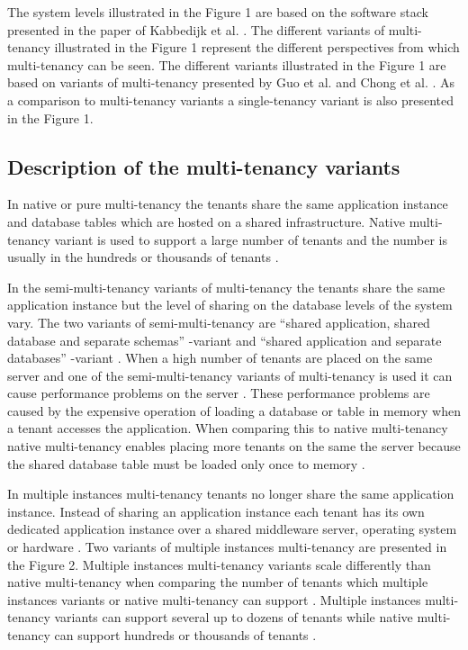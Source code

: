 \documentclass[conference]{sasmoota2017}
\begin{document}
The system levels illustrated in the Figure 1 are based on the software stack presented in the paper of Kabbedijk et al. \cite{Kabbedijk2015:Defining}. The different variants of multi-tenancy illustrated in the Figure 1 represent the different perspectives from which multi-tenancy can be seen. The different variants illustrated in the Figure 1 are based on variants of multi-tenancy presented by Guo et al. \cite{Guo:2007:FrameworkForNative} and Chong et al. \cite{Chong:2006:MultiTenantDataArchitecture}. As a comparison to multi-tenancy variants a single-tenancy variant is also presented in the Figure 1. 


\subsection{Description of the multi-tenancy variants}

In native or pure multi-tenancy \cite{Kabbedijk2015:Defining, Guo:2007:FrameworkForNative} the tenants share the same application instance and database tables which are hosted on a shared infrastructure. Native multi-tenancy variant is used to support a large number of tenants and the number is usually in the hundreds or thousands of tenants \cite{Guo:2007:FrameworkForNative}. 

In the semi-multi-tenancy variants of multi-tenancy \cite{Chong:2006:MultiTenantDataArchitecture, Bezemer:2010:MaintenanceDream} the tenants share the same application instance but the level of sharing on the database levels of the system vary. The two variants of semi-multi-tenancy are “shared application, shared database and separate schemas” -variant and “shared application and separate databases” -variant \cite{Chong:2006:MultiTenantDataArchitecture}. When a high number of tenants are placed on the same server and one of the semi-multi-tenancy variants of multi-tenancy is used it can cause performance problems on the server \cite{Bezemer:2010:MaintenanceDream}. These performance problems are caused by the expensive operation of loading a database or table in memory when a tenant accesses the application. When comparing this to native multi-tenancy native multi-tenancy enables placing more tenants on the same the server because the shared database table must be loaded only once to memory \cite{Bezemer:2010:MaintenanceDream}.

In multiple instances multi-tenancy \cite{Guo:2007:FrameworkForNative} tenants no longer share the same application instance. Instead of sharing an application instance each tenant has its own dedicated application instance over a shared middleware server, operating system or hardware \cite{Guo:2007:FrameworkForNative}. Two variants of multiple instances multi-tenancy are presented in the Figure 2. Multiple instances multi-tenancy variants scale differently than native multi-tenancy when comparing the number of tenants which multiple instances variants or native multi-tenancy can support \cite{Guo:2007:FrameworkForNative}. Multiple instances multi-tenancy variants can support several up to dozens of tenants while native multi-tenancy can support hundreds or thousands of tenants \cite{Guo:2007:FrameworkForNative}.
\end{document}
